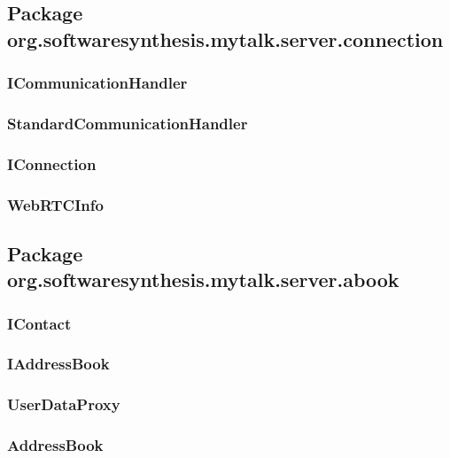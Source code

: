 \subsection{Package org.softwaresynthesis.mytalk.server.connection}\label{sec:connection}

\subsubsection{ICommunicationHandler}\label{sec:icommunicationhandler}

\subsubsection{StandardCommunicationHandler}\label{sec:standardcommunicationhandler}

\subsubsection{IConnection}\label{sec:iconnection}

\subsubsection{WebRTCInfo}\label{sec:webrtcinfo}

\subsection{Package org.softwaresynthesis.mytalk.server.abook}\label{sec:abook}

\subsubsection{IContact}\label{sec:icontact}

\subsubsection{IAddressBook}\label{sec:iaddressbook}

\subsubsection{UserDataProxy}\label{sec:userdataproxy}

\subsubsection{AddressBook}\label{sec:addressbook}

